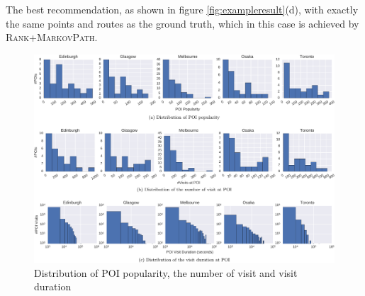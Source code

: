 The best recommendation, as shown in figure \ref{fig:exampleresult}(d), with exactly the same points and routes as the ground truth,
which in this case is achieved by \textsc{Rank+MarkovPath}.



\begin{figure}[t]
\includegraphics[width=\textwidth]{fig/feature_distro.pdf}
\caption{Distribution of POI popularity, the number of visit and visit duration}
\label{fig:distro}
\end{figure}
